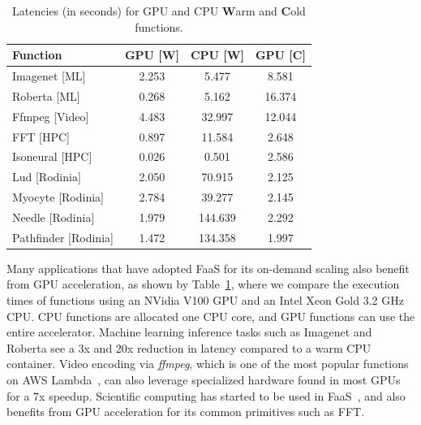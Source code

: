 \begin{table}
  \centering
  \caption{Latencies (in seconds) for GPU and CPU \textbf{W}arm and \textbf{C}old functions.}
  \label{tab:gpu-cpu}
  \begin{tabular}{lccc}
    \hline
    Function & GPU [\textbf{W}] & CPU [\textbf{W}] & GPU [\textbf{C}] \\
    \hline
  Imagenet [ML] & 2.253 & 5.477 &     8.581 \\
  Roberta [ML] & 0.268 & 5.162 &     16.374 \\
  Ffmpeg [Video] & 4.483 & 32.997 &     12.044 \\
  FFT [HPC] & 0.897 & 11.584 &     2.648 \\
  Isoneural [HPC] & 0.026 & 0.501 &     2.586 \\
  Lud [Rodinia] & 2.050 & 70.915 &     2.125 \\
    Myocyte [Rodinia] & 2.784 & 39.277 &      2.145 \\
  Needle [Rodinia] & 1.979 & 144.639 &     2.292 \\
  Pathfinder [Rodinia] & 1.472 & 134.358 &     1.997 \\
  \end{tabular}
\end{table}



Many applications that have adopted FaaS for its on-demand scaling also benefit from GPU acceleration, as shown by Table~\ref{tab:gpu-cpu}, where we compare the execution times of functions using an NVidia V100 GPU and an Intel Xeon Gold 3.2 GHz CPU.
CPU functions are allocated one CPU core, and GPU functions can use the entire accelerator.
Machine learning inference tasks such as Imagenet and Roberta see a 3x and 20x reduction in latency compared to a warm CPU container. 
Video encoding via \emph{ffmpeg}, which is one of the most popular functions on AWS Lambda~\cite{aws-netflix}, can also leverage specialized hardware found in most GPUs for a 7x speedup. 
Scientific computing has started to be used in FaaS~\cite{john_sweep_2019,mocskos_faaster_2018,werner2018serverless,shankar2020serverless}, and also benefits from GPU acceleration for its common primitives such as FFT.


